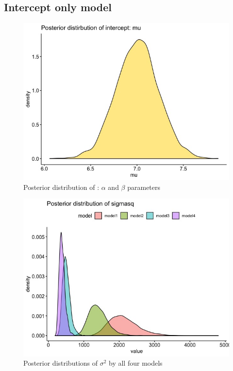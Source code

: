 \documentclass[11pt,twocolumn]{asaproc}
\begin{document}
\subsection{Intercept only model}

\begin{figure}[t]
\centering\includegraphics[scale=.30]{interceptM1.jpeg}
\caption{Posterior distribution of : $\alpha$ and $\beta$ parameters}
\label{fig:intercept}
\end{figure}

\begin{figure}[t]
\centering\includegraphics[scale=.30]{sigmasq.jpeg}
\caption{Posterior distributions of $\sigma^2$ by all four models}
\label{fig:sigmas}
\end{figure}
\end{document}
